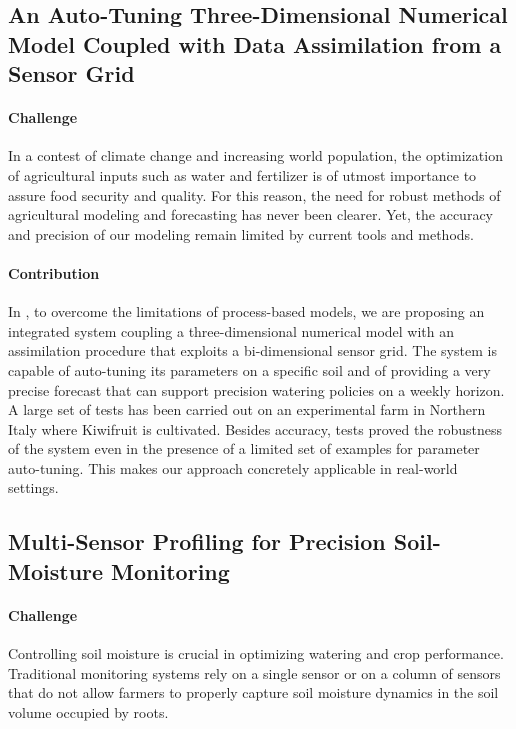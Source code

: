 \subsection*{An Auto-Tuning Three-Dimensional Numerical Model Coupled with Data Assimilation from a Sensor Grid}

\paragraph{Challenge} In a contest of climate change and increasing world population, the optimization of agricultural inputs such as water and fertilizer is of utmost importance to assure food security and quality.
For this reason, the need for robust methods of agricultural modeling and forecasting has never been clearer.
Yet, the accuracy and precision of our modeling remain limited by current tools and methods.

\paragraph{Contribution} In , to overcome the limitations of process-based models, we are proposing an integrated system coupling a three-dimensional numerical model with an assimilation procedure that exploits a bi-dimensional sensor grid.
The system is capable of auto-tuning its parameters on a specific soil and of providing a very precise forecast that can support precision watering policies on a weekly horizon.
A large set of tests has been carried out on an experimental farm in Northern Italy where Kiwifruit is cultivated.
Besides accuracy, tests proved the robustness of the system even in the presence of a limited set of examples for parameter auto-tuning.
This makes our approach concretely applicable in real-world settings.

\subsection*{Multi-Sensor Profiling for Precision Soil-Moisture Monitoring}


\paragraph{Challenge} Controlling soil moisture is crucial in optimizing watering and crop performance.
Traditional monitoring systems rely on a single sensor or on a column of sensors that do not allow farmers to properly capture soil moisture dynamics in the soil volume occupied by roots.


